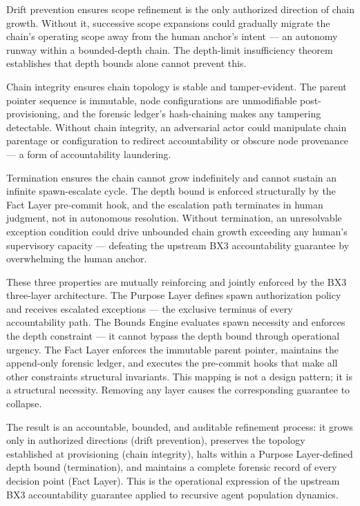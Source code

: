 Drift prevention ensures scope refinement is the only authorized direction of chain growth. Without it, successive scope expansions could gradually migrate the chain's operating scope away from the human anchor's intent — an autonomy runway within a bounded-depth chain. The depth-limit insufficiency theorem establishes that depth bounds alone cannot prevent this.

Chain integrity ensures chain topology is stable and tamper-evident. The parent pointer sequence is immutable, node configurations are unmodifiable post-provisioning, and the forensic ledger's hash-chaining makes any tampering detectable. Without chain integrity, an adversarial actor could manipulate chain parentage or configuration to redirect accountability or obscure node provenance — a form of accountability laundering.

Termination ensures the chain cannot grow indefinitely and cannot sustain an infinite spawn-escalate cycle. The depth bound is enforced structurally by the Fact Layer pre-commit hook, and the escalation path terminates in human judgment, not in autonomous resolution. Without termination, an unresolvable exception condition could drive unbounded chain growth exceeding any human's supervisory capacity — defeating the upstream BX3 accountability guarantee by overwhelming the human anchor.

These three properties are mutually reinforcing and jointly enforced by the BX3 three-layer architecture. The Purpose Layer defines spawn authorization policy and receives escalated exceptions — the exclusive terminus of every accountability path. The Bounds Engine evaluates spawn necessity and enforces the depth constraint — it cannot bypass the depth bound through operational urgency. The Fact Layer enforces the immutable parent pointer, maintains the append-only forensic ledger, and executes the pre-commit hooks that make all other constraints structural invariants. This mapping is not a design pattern; it is a structural necessity. Removing any layer causes the corresponding guarantee to collapse.

The result is an accountable, bounded, and auditable refinement process: it grows only in authorized directions (drift prevention), preserves the topology established at provisioning (chain integrity), halts within a Purpose Layer-defined depth bound (termination), and maintains a complete forensic record of every decision point (Fact Layer). This is the operational expression of the upstream BX3 accountability guarantee applied to recursive agent population dynamics.